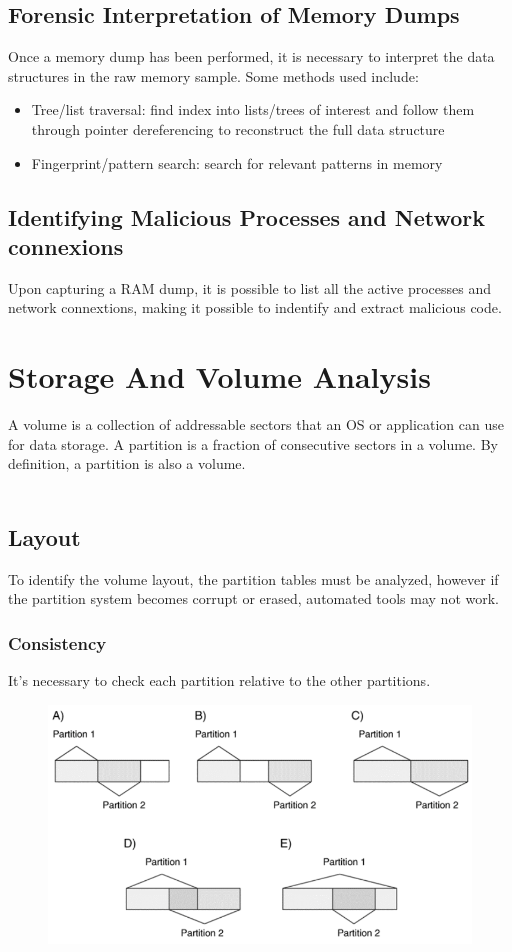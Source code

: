 \documentclass[10pt,a4paper]{report}
\begin{document}
\subsection{Forensic Interpretation of Memory Dumps}
Once a memory dump has been performed, it is necessary to interpret the data structures in the raw memory sample. Some methods used include:
\begin{itemize}
\item Tree/list traversal: find index into lists/trees of interest and follow them through pointer dereferencing to reconstruct the full data structure
\item Fingerprint/pattern search: search for relevant patterns in memory
\end{itemize}
\subsection{Identifying Malicious Processes and Network connexions}
Upon capturing a RAM dump, it is possible to list all the active processes and network connextions, making it possible to indentify and extract malicious code.
\section{Storage And Volume Analysis}
A volume is a collection of addressable sectors that an OS or application can use for data storage. A partition is a fraction of consecutive sectors in a volume. By definition, a partition is also a volume.\\
\\
\subsection{Layout}
To identify the volume layout, the partition tables must be analyzed, however if the partition system becomes corrupt or erased, automated tools may not work.
\subsubsection{Consistency}
It's necessary to check  each partition relative to the other partitions.
\begin{figure}[H]
\centering
\includegraphics[scale=0.5]{10.png}
\end{figure}
\end{document}
